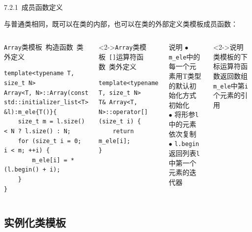 \begin{frame}[fragile]{7.2.1~成员函数定义}

与普通类相同，既可以在类的内部，也可以在\alert{类的外部}定义\alert{类模板成员函数}：

\vspace{-4mm}

\begin{columns}[t]

\begin{blueblock}{\texttt{Array}类模板~构造函数~类外定义}
\vspace{-2mm}
\begin{lstlisting}[moreemph={T,Array,initializer}]
template<typename T, size_t N>
Array<T, N>::Array(const std::initializer_list<T> &l):m_ele{T()}{
    size_t m = l.size() < N ? l.size() : N;
    for (size_t i = 0; i < m; ++i) {
        m_ele[i] = *(l.begin() + i);
    }
}
\end{lstlisting}
\end{blueblock}
\begin{blueblock}<2->{\texttt{Array}类模板~\texttt{[]}运算符函数~类外定义}
\vspace{-2mm}
\begin{lstlisting}[moreemph={T,Array}]
template<typename T, size_t N>
T& Array<T, N>::operator[](size_t i) {
    return m_ele[i];
}
\end{lstlisting}
\end{blueblock}

\begin{yellowblock}{说明}
$\bullet$ \texttt{m\_ele}中的每一个元素用T类型的默认初始化方式初始化\\
$\bullet$ 将形参\texttt{l}中的元素依次复制\\
$\bullet$ \texttt{l.begin}返回列表\texttt{l}中第一个元素的迭代器
\end{yellowblock}
\begin{yellowblock}<2->{说明}
类模板的下标运算符函数返回数组\texttt{m\_ele}中第\texttt{i}个元素的引用
\end{yellowblock}

\end{columns}

\end{frame}


\subsection{实例化类模板}

